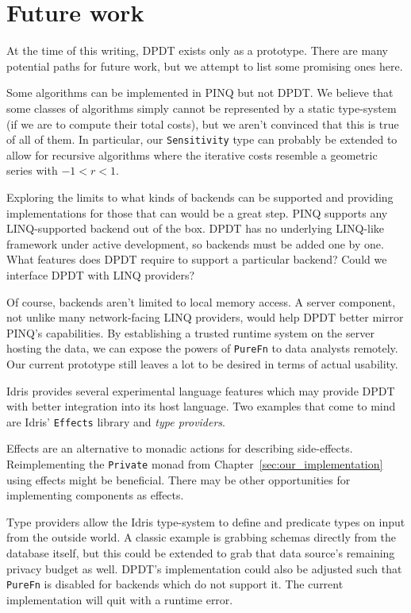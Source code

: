 \documentclass[12pt]{report}
\begin{document}
\section{Future work}\label{sec:future_work}

At the time of this writing, DPDT exists only as a prototype.
There are many potential paths for future work, but we attempt to list some promising ones here.

Some algorithms can be implemented in PINQ but not DPDT.
We believe that some classes of algorithms simply cannot be represented by a static type-system (if we are to compute their total costs), but we aren't convinced that this is true of all of them.
In particular, our \texttt{Sensitivity} type can probably be extended to allow for recursive algorithms where the iterative costs resemble a geometric series with $-1 < r < 1$.

Exploring the limits to what kinds of backends can be supported and providing implementations for those that can would be a great step.
PINQ supports any LINQ-supported backend out of the box.
DPDT has no underlying LINQ-like framework under active development, so backends must be added one by one.
What features does DPDT require to support a particular backend?
Could we interface DPDT with LINQ providers?

Of course, backends aren't limited to local memory access.
A server component, not unlike many network-facing LINQ providers, would help DPDT better mirror PINQ's capabilities.
By establishing a trusted runtime system on the server hosting the data, we can expose the powers of \texttt{PureFn} to data analysts remotely.
Our current prototype still leaves a lot to be desired in terms of actual usability.


Idris provides several experimental language features which may provide DPDT with better integration into its host language.
Two examples that come to mind are Idris' \texttt{Effects} library and \textit{type providers}.

Effects are an alternative to monadic actions for describing side-effects.
Reimplementing the \texttt{Private} monad from Chapter~\ref{sec:our_implementation} using effects might be beneficial.
There may be other opportunities for implementing components as effects.

Type providers allow the Idris type-system to define and predicate types on input from the outside world.
A classic example is grabbing schemas directly from the database itself, but this could be extended to grab that data source's remaining privacy budget as well.
DPDT's implementation could also be adjusted such that \texttt{PureFn} is disabled for backends which do not support it.
The current implementation will quit with a runtime error.
\end{document}
